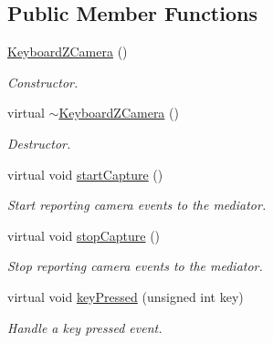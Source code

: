 \subsection*{Public Member Functions}
\begin{DoxyCompactItemize}
\item 
\hypertarget{classKeyboardZCamera_a841092440fecfa434ea56764c25ecf13}{
\hyperlink{classKeyboardZCamera_a841092440fecfa434ea56764c25ecf13}{KeyboardZCamera} ()}
\label{classKeyboardZCamera_a841092440fecfa434ea56764c25ecf13}

\begin{DoxyCompactList}\small\item\em Constructor. \item\end{DoxyCompactList}\item 
\hypertarget{classKeyboardZCamera_aec1ca833ec96488fb639de9d70c019b5}{
virtual \hyperlink{classKeyboardZCamera_aec1ca833ec96488fb639de9d70c019b5}{$\sim$KeyboardZCamera} ()}
\label{classKeyboardZCamera_aec1ca833ec96488fb639de9d70c019b5}

\begin{DoxyCompactList}\small\item\em Destructor. \item\end{DoxyCompactList}\item 
\hypertarget{classKeyboardZCamera_a58ab32d15b54521d29dbb538d462d49e}{
virtual void \hyperlink{classKeyboardZCamera_a58ab32d15b54521d29dbb538d462d49e}{startCapture} ()}
\label{classKeyboardZCamera_a58ab32d15b54521d29dbb538d462d49e}

\begin{DoxyCompactList}\small\item\em Start reporting camera events to the mediator. \item\end{DoxyCompactList}\item 
\hypertarget{classKeyboardZCamera_ad8e4f0a5c2c1d5e351231e11f32b0e44}{
virtual void \hyperlink{classKeyboardZCamera_ad8e4f0a5c2c1d5e351231e11f32b0e44}{stopCapture} ()}
\label{classKeyboardZCamera_ad8e4f0a5c2c1d5e351231e11f32b0e44}

\begin{DoxyCompactList}\small\item\em Stop reporting camera events to the mediator. \item\end{DoxyCompactList}\item 
\hypertarget{classKeyboardZCamera_aa939d58755a9b40da1339dfed4fcb5c0}{
virtual void \hyperlink{classKeyboardZCamera_aa939d58755a9b40da1339dfed4fcb5c0}{keyPressed} (unsigned int key)}
\label{classKeyboardZCamera_aa939d58755a9b40da1339dfed4fcb5c0}

\begin{DoxyCompactList}\small\item\em Handle a key pressed event. \item\end{DoxyCompactList}\end{DoxyCompactItemize}


